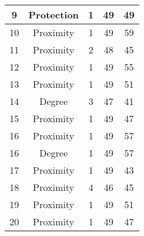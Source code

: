 \documentclass[results.tex]{subfiles}
\begin{document}
\begin{center}
\begin{tabular}{| c || c | c | c | c |}
            \hline
            9                       & Protection                   & 1                      & 49                      & 49                   \\
            \hline
            10                      & Proximity                    & 1                      & 49                      & 59                   \\
            \hline
            11                      & Proximity                    & 2                      & 48                      & 45                   \\
            \hline
            12                      & Proximity                    & 1                      & 49                      & 55                   \\
            \hline
            13                      & Proximity                    & 1                      & 49                      & 51                   \\
            \hline
            14                      & Degree                       & 3                      & 47                      & 41                   \\
            \hline
            15                      & Proximity                    & 1                      & 49                      & 47                   \\
            \hline
            16                      & Proximity                    & 1                      & 49                      & 57                   \\
            \hline
            16                      & Degree                       & 1                      & 49                      & 57                   \\
            \hline
            17                      & Proximity                    & 1                      & 49                      & 43                   \\
            \hline
            18                      & Proximity                    & 4                      & 46                      & 45                   \\
            \hline
            19                      & Proximity                    & 1                      & 49                      & 51                   \\
            \hline
            20                      & Proximity                    & 1                      & 49                      & 47                   \\

\end{tabular}
\end{center}
\end{document}

